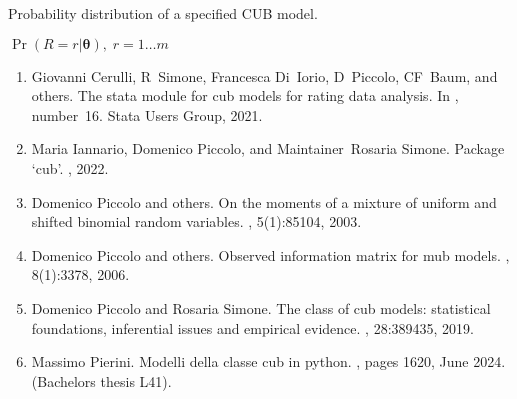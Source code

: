 \documentclass[letterpaper,10pt,english]{sphinxmanual}
\begin{document}

\begin{fulllineitems}
\label{\detokenize{cubmods:cubmods.cub.pmf}}
\pysigstartsignatures
{}
\pysigstopsignatures
\sphinxAtStartPar
Probability distribution of a specified CUB model.

\sphinxAtStartPar
\(\Pr(R = r | \pmb\theta),\; r=1 \ldots m\)
\begin{description}
\begin{enumerate}
%
\setcounter{enumi}{0}
\item {} 
\sphinxAtStartPar
Giovanni Cerulli, R Simone, Francesca Di Iorio, D Piccolo, CF Baum, and others. The stata module for cub models for rating data analysis. In , number 16. Stata Users Group, 2021.

\item {} 
\sphinxAtStartPar
Maria Iannario, Domenico Piccolo, and Maintainer Rosaria Simone. Package ‘cub’. , 2022.

\item {} 
\sphinxAtStartPar
Domenico Piccolo and others. On the moments of a mixture of uniform and shifted binomial random variables. , 5(1):85\textendash{}104, 2003.

\item {} 
\sphinxAtStartPar
Domenico Piccolo and others. Observed information matrix for mub models. , 8(1):33\textendash{}78, 2006.

\item {} 
\sphinxAtStartPar
Domenico Piccolo and Rosaria Simone. The class of cub models: statistical foundations, inferential issues and empirical evidence. , 28:389\textendash{}435, 2019.

\item {} 
\sphinxAtStartPar
Massimo Pierini. Modelli della classe cub in python. , pages 16\textendash{}20, June 2024. (Bachelor\textquotesingle{}s thesis L\sphinxhyphen{}41).


\end{enumerate}
\end{description}
\end{fulllineitems}
\end{document}
